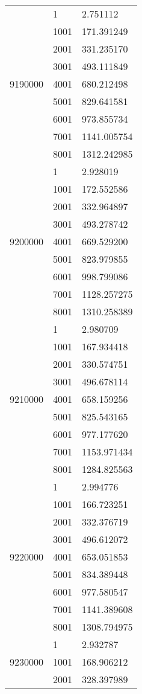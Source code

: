 \begin{table}[htb!]
\begin{tabular}{lll}
\multirow[c]{9}{*}{9190000} & 1 & 2.751112 \\
 & 1001 & 171.391249 \\
 & 2001 & 331.235170 \\
 & 3001 & 493.111849 \\
 & 4001 & 680.212498 \\
 & 5001 & 829.641581 \\
 & 6001 & 973.855734 \\
 & 7001 & 1141.005754 \\
 & 8001 & 1312.242985 \\
\multirow[c]{9}{*}{9200000} & 1 & 2.928019 \\
 & 1001 & 172.552586 \\
 & 2001 & 332.964897 \\
 & 3001 & 493.278742 \\
 & 4001 & 669.529200 \\
 & 5001 & 823.979855 \\
 & 6001 & 998.799086 \\
 & 7001 & 1128.257275 \\
 & 8001 & 1310.258389 \\
\multirow[c]{9}{*}{9210000} & 1 & 2.980709 \\
 & 1001 & 167.934418 \\
 & 2001 & 330.574751 \\
 & 3001 & 496.678114 \\
 & 4001 & 658.159256 \\
 & 5001 & 825.543165 \\
 & 6001 & 977.177620 \\
 & 7001 & 1153.971434 \\
 & 8001 & 1284.825563 \\
\multirow[c]{9}{*}{9220000} & 1 & 2.994776 \\
 & 1001 & 166.723251 \\
 & 2001 & 332.376719 \\
 & 3001 & 496.612072 \\
 & 4001 & 653.051853 \\
 & 5001 & 834.389448 \\
 & 6001 & 977.580547 \\
 & 7001 & 1141.389608 \\
 & 8001 & 1308.794975 \\
\multirow[c]{9}{*}{9230000} & 1 & 2.932787 \\
 & 1001 & 168.906212 \\
 & 2001 & 328.397989 \\

\end{tabular}
\end{table}
